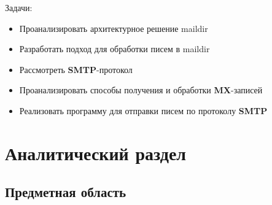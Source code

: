\documentclass[a4paper,12pt]{report}
\begin{document}
Задачи:
\begin{itemize}
    \item Проанализировать архитектурное решение maildir
    \item Разработать подход для обработки писем в maildir 
    \item Рассмотреть \textbf{SMTP}-протокол
    \item Проанализировать способы получения и обработки \textbf{MX}-записей
    \item Реализовать программу для отправки писем по протоколу \textbf{SMTP}
\end{itemize}








\chapter{Аналитический раздел}
\section{Предметная область}
\end{document}
